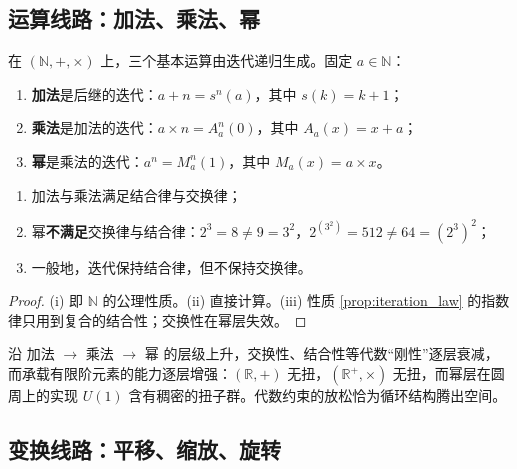 \subsection{运算线路：加法、乘法、幂}

\begin{definition}[运算的迭代生成]\label{def:hyperoperation}
在 $(\mathbb{N},+,\times)$ 上，三个基本运算由迭代递归生成。固定 $a\in\mathbb{N}$：
\begin{enumerate}[label=(\roman*)]
    \item \textbf{加法}是后继的迭代：$a+n=s^n(a)$，其中 $s(k)=k+1$；
    \item \textbf{乘法}是加法的迭代：$a\times n=A_a^n(0)$，其中 $A_a(x)=x+a$；
    \item \textbf{幂}是乘法的迭代：$a^n=M_a^n(1)$，其中 $M_a(x)=a\times x$。
\end{enumerate}
\end{definition}

\begin{property}[运算层级的结合律传递]\label{prop:hyperoperation_assoc}
\begin{enumerate}[label=(\roman*)]
    \item 加法与乘法满足结合律与交换律；
    \item 幂\textbf{不满足}交换律与结合律：$2^3=8\neq 9=3^2$，$2^{(3^2)}=512\neq 64=(2^3)^2$；
    \item 一般地，迭代保持结合律，但不保持交换律。
\end{enumerate}
\end{property}

\begin{proof}
(i) 即 $\mathbb{N}$ 的公理性质。(ii) 直接计算。(iii) 性质 \ref{prop:iteration_law} 的指数律只用到复合的结合性；交换性在幂层失效。
\end{proof}

\begin{remark}\label{rem:hierarchy_duality}
沿 加法 $\to$ 乘法 $\to$ 幂 的层级上升，交换性、结合性等代数“刚性”逐层衰减，而承载有限阶元素的能力逐层增强：$(\mathbb{R},+)$ 无扭，$(\mathbb{R}^+,\times)$ 无扭，而幂层在圆周上的实现 $U(1)$ 含有稠密的扭子群。代数约束的放松恰为循环结构腾出空间。
\end{remark}

\subsection{变换线路：平移、缩放、旋转}


